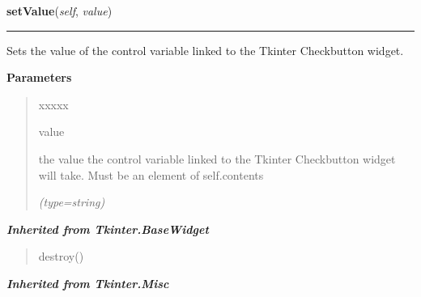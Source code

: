     \label{nMOLDYN:GUI:Widgets:ComboCheckbutton:setValue}

    \vspace{0.5ex}

\hspace{.8\funcindent}\begin{boxedminipage}{\funcwidth}

    \raggedright \textbf{setValue}(\textit{self}, \textit{value})

    \vspace{-1.5ex}

    \rule{\textwidth}{0.5\fboxrule}
\setlength{\parskip}{2ex}
    Sets the value of the control variable linked to the Tkinter 
    Checkbutton widget.

\setlength{\parskip}{1ex}
      \textbf{Parameters}
      \vspace{-1ex}

      \begin{quote}
        \begin{Ventry}{xxxxx}

          \item[value]

          the value the control variable linked to the Tkinter Checkbutton 
          widget will take. Must be an element of 
          {\textbar}self.contents{\textbar}

            {\it (type=string)}

        \end{Ventry}

      \end{quote}

    \end{boxedminipage}


\large{\textbf{\textit{Inherited from Tkinter.BaseWidget}}}

\begin{quote}
destroy()
\end{quote}

\large{\textbf{\textit{Inherited from Tkinter.Misc}}}

